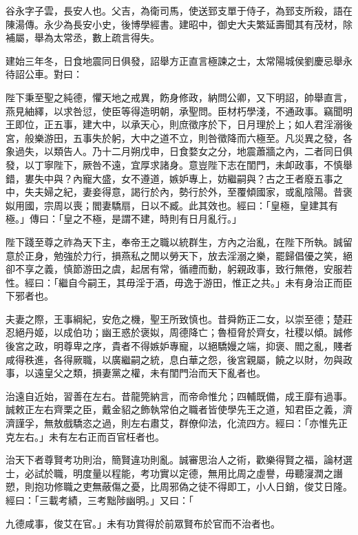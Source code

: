 
\begin{pinyinscope}
谷永字子雲，長安人也。父吉，為衛司馬，使送郅支單于侍子，為郅支所殺，語在陳湯傳。永少為長安小史，後博學經書。建昭中，御史大夫繁延壽聞其有茂材，除補屬，舉為太常丞，數上疏言得失。

建始三年冬，日食地震同日俱發，詔舉方正直言極諫之士，太常陽城侯劉慶忌舉永待詔公車。對曰：

陛下秉至聖之純德，懼天地之戒異，飭身修政，納問公卿，又下明詔，帥舉直言，燕見紬繹，以求咎愆，使臣等得造明朝，承聖問。臣材朽學淺，不通政事。竊聞明王即位，正五事，建大中，以承天心，則庶徵序於下，日月理於上；如人君淫溺後宮，般樂游田，五事失於躬，大中之道不立，則咎徵降而六極至。凡災異之發，各象過失，以類告人。乃十二月朔戊申，日食婺女之分，地震蕭牆之內，二者同日俱發，以丁寧陛下，厥咎不遠，宜厚求諸身。意豈陛下志在閨門，未卹政事，不慎舉錯，婁失中與？內寵大盛，女不遵道，嫉妒專上，妨繼嗣與？古之王者廢五事之中，失夫婦之紀，妻妾得意，謁行於內，勢行於外，至覆傾國家，或亂陰陽。昔褒姒用國，宗周以喪；閻妻驕扇，日以不臧。此其效也。經曰：「皇極，皇建其有極。」傳曰：「皇之不極，是謂不建，時則有日月亂行。」

陛下踐至尊之祚為天下主，奉帝王之職以統群生，方內之治亂，在陛下所執。誠留意於正身，勉強於力行，損燕私之閒以勞天下，放去淫溺之樂，罷歸倡優之笑，絕卻不享之義，慎節游田之虞，起居有常，循禮而動，躬親政事，致行無倦，安服若性。經曰：「繼自今嗣王，其毋淫于酒，毋逸于游田，惟正之共。」未有身治正而臣下邪者也。

夫妻之際，王事綱紀，安危之機，聖王所致慎也。昔舜飭正二女，以崇至德；楚莊忍絕丹姬，以成伯功；幽王惑於褒姒，周德降亡；魯桓脅於齊女，社稷以傾。誠修後宮之政，明尊卑之序，貴者不得嫉妒專寵，以絕驕嫚之端，抑褒、閻之亂，賤者咸得秩進，各得厥職，以廣繼嗣之統，息白華之怨，後宮親屬，饒之以財，勿與政事，以遠皇父之類，損妻黨之權，未有閨門治而天下亂者也。

治遠自近始，習善在左右。昔龍筦納言，而帝命惟允；四輔既備，成王靡有過事。誠敕正左右齊栗之臣，戴金貂之飾執常伯之職者皆使學先王之道，知君臣之義，濟濟謹孚，無敖戲驕恣之過，則左右肅艾，群僚仰法，化流四方。經曰：「亦惟先正克左右。」未有左右正而百官枉者也。

治天下者尊賢考功則治，簡賢違功則亂。誠審思治人之術，歡樂得賢之福，論材選士，必試於職，明度量以程能，考功實以定德，無用比周之虛譽，毋聽寖潤之譖愬，則抱功修職之吏無蔽傷之憂，比周邪偽之徒不得即工，小人日銷，俊艾日隆。經曰：「三載考績，三考黜陟幽明。」又曰：「

九德咸事，俊艾在官。」未有功賞得於前眾賢布於官而不治者也。


\end{pinyinscope}
